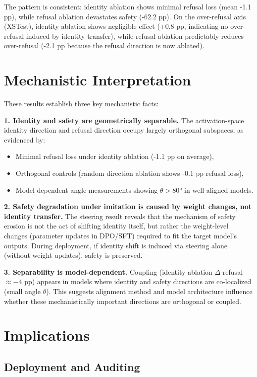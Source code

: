 \documentclass[letterpaper,twocolumn]{article}
\begin{document}
The pattern is consistent: identity ablation shows minimal refusal loss (mean -1.1 pp), while refusal ablation devastates safety (-62.2 pp). On the over-refusal axis (XSTest), identity ablation shows negligible effect (+0.8 pp, indicating no over-refusal induced by identity transfer), while refusal ablation predictably reduces over-refusal (-2.1 pp because the refusal direction is now ablated).

\section{Mechanistic Interpretation}

These results establish three key mechanistic facts:

\textbf{1. Identity and safety are geometrically separable.} The activation-space identity direction and refusal direction occupy largely orthogonal subspaces, as evidenced by:
\begin{itemize}
\item Minimal refusal loss under identity ablation (-1.1 pp on average),
\item Orthogonal controls (random direction ablation shows -0.1 pp refusal loss),
\item Model-dependent angle measurements showing $\theta > 80°$ in well-aligned models.
\end{itemize}

\textbf{2. Safety degradation under imitation is caused by weight changes, not identity transfer.} The steering result reveals that the mechanism of safety erosion is not the act of shifting identity itself, but rather the weight-level changes (parameter updates in DPO/SFT) required to fit the target model's outputs. During deployment, if identity shift is induced via steering alone (without weight updates), safety is preserved.

\textbf{3. Separability is model-dependent.} Coupling (identity ablation $\Delta$-refusal $\approx -4$ pp) appears in models where identity and safety directions are co-localized (small angle $\theta$). This suggests alignment method and model architecture influence whether these mechanistically important directions are orthogonal or coupled.

\section{Implications}

\subsection{Deployment and Auditing}
\end{document}
